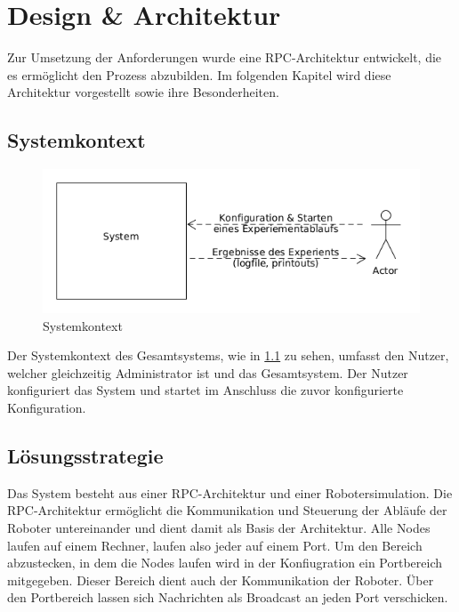 %
\chapter{Design \& Architektur}

Zur Umsetzung der Anforderungen wurde eine RPC-Architektur entwickelt, die es ermöglicht den Prozess
abzubilden. Im folgenden Kapitel wird diese Architektur vorgestellt sowie ihre Besonderheiten.

\section{Systemkontext}

\begin{figure}[h]
 \includegraphics[width=\textwidth]{../diagrams/1_systemkontext.png}
 \caption{Systemkontext}
 \label{fig:systemkontext}
\end{figure}

Der Systemkontext des Gesamtsystems, wie in \ref{fig:systemkontext} zu sehen,
umfasst den Nutzer, welcher gleichzeitig Administrator ist und das Gesamtsystem.
Der Nutzer konfiguriert das System und startet im Anschluss die zuvor konfigurierte Konfiguration.
\clearpage

\section{Lösungsstrategie}

Das System besteht aus einer RPC-Architektur und einer Robotersimulation. Die RPC-Architektur ermöglicht
die Kommunikation und Steuerung der Abläufe der Roboter untereinander und dient damit als Basis der
Architektur. Alle Nodes laufen auf einem Rechner, laufen also jeder auf einem Port.
Um den Bereich abzustecken, in dem die Nodes laufen wird in der Konfiugration ein Portbereich mitgegeben.
Dieser Bereich dient auch der Kommunikation der Roboter. Über den Portbereich lassen sich Nachrichten
als Broadcast an jeden Port verschicken.

